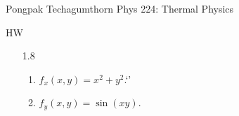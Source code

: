 \documentclass{article}
\begin{document}
\large %
{\Large Pongpak Techagumthorn
\hfill Phys 224: Thermal Physics}
\begin{center}
{\Large
HW
}
\end{center}
\vspace{0.1in}
\begin{enumerate}
    \item [1.8]
    \begin{enumerate}
        \item $f_x(x,y) = x^2+y^2$.`'
        \item $f_y(x,y) = \sin(xy)$.
    \end{enumerate}
    \vspace{0.1in}

\end{enumerate}
\end{document}
